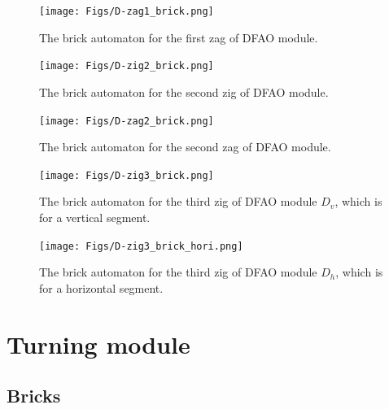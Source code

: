\documentclass[runningheads]{llncs}
\begin{document}
\begin{figure}[ht]
\centering
\texttt{[image: Figs/D-zag1\_brick.png]}
\caption{The brick automaton for the first zag of DFAO module.}
\label{fig:brick_automaton_Dzag1}
\end{figure}

\begin{figure}[ht]
\centering
\texttt{[image: Figs/D-zig2\_brick.png]}
\caption{The brick automaton for the second zig of DFAO module.}
\label{fig:brick_automaton_Dzig2}
\end{figure}

\begin{figure}[ht]
\centering
\texttt{[image: Figs/D-zag2\_brick.png]}
\caption{The brick automaton for the second zag of DFAO module.}
\label{fig:brick_automaton_Dzag2}
\end{figure}

\begin{figure}[ht]
\centering
\texttt{[image: Figs/D-zig3\_brick.png]}
\caption{The brick automaton for the third zig of DFAO module $D_v$, which is for a vertical segment.}
\label{fig:brick_automaton_Dzig3}
\end{figure}

\begin{figure}[ht]
\centering
\texttt{[image: Figs/D-zig3\_brick\_hori.png]}
\caption{The brick automaton for the third zig of DFAO module $D_h$, which is for a horizontal segment.}
\label{fig:brick_automaton_Dzig3_hori}
\end{figure}

\clearpage

	\section{Turning module}
	\label{ap_sect:Turner_module}

	\subsection{Bricks}
	\label{ap_subsect:Turner_module_bricks}
\end{document}
